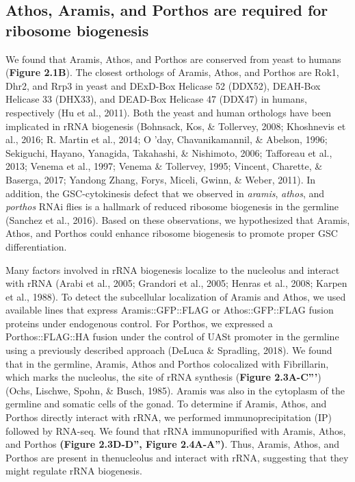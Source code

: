 \documentclass[12pt,oneside]{reedthesis}
\begin{document}
\hypertarget{athos-aramis-and-porthos-are-required-for-ribosome-biogenesis}{%
\subsection{Athos, Aramis, and Porthos are required for ribosome biogenesis}\label{athos-aramis-and-porthos-are-required-for-ribosome-biogenesis}}

We found that Aramis, Athos, and Porthos are conserved from yeast to
humans (\textbf{Figure 2.1B}). The closest orthologs of Aramis, Athos, and
Porthos are Rok1, Dhr2, and Rrp3 in yeast and DExD-Box Helicase 52
(DDX52), DEAH-Box Helicase 33 (DHX33), and DEAD-Box Helicase 47 (DDX47)
in humans, respectively (Hu et al., 2011). Both
the yeast and human orthologs have been implicated in rRNA biogenesis
(Bohnsack, Kos, \& Tollervey, 2008; Khoshnevis et al., 2016; R. Martin et al., 2014; O 'day, Chavanikamannil, \& Abelson, 1996; Sekiguchi, Hayano, Yanagida, Takahashi, \& Nishimoto, 2006; Tafforeau et al., 2013; Venema et al., 1997; Venema \& Tollervey, 1995; Vincent, Charette, \& Baserga, 2017; Yandong Zhang, Forys, Miceli, Gwinn, \& Weber, 2011). In addition, the
GSC-cytokinesis defect that we observed in \emph{aramis}, \emph{athos}, and
\emph{porthos} RNAi flies is a hallmark of reduced ribosome biogenesis in the
germline (Sanchez et al., 2016). Based on these observations, we
hypothesized that Aramis, Athos, and Porthos could enhance ribosome
biogenesis to promote proper GSC differentiation.

Many factors involved in rRNA biogenesis localize to the nucleolus and
interact with rRNA (Arabi et al., 2005; Grandori et al., 2005; Henras et al., 2008; Karpen et al., 1988). To detect
the subcellular localization of Aramis and Athos, we used available
lines that express Aramis::GFP::FLAG or Athos::GFP::FLAG fusion proteins
under endogenous control. For Porthos, we expressed a Porthos::FLAG::HA
fusion under the control of UASt promoter in the germline using a
previously described approach (DeLuca \& Spradling, 2018).
We found that in the germline, Aramis, Athos and Porthos colocalized
with Fibrillarin, which marks the nucleolus, the site of rRNA synthesis
(\textbf{Figure 2.3A-C'''}) (Ochs, Lischwe, Spohn, \& Busch, 1985). Aramis was
also in the cytoplasm of the germline and somatic cells of the gonad. To
determine if Aramis, Athos, and Porthos directly interact with rRNA, we
performed immunoprecipitation (IP) followed by RNA-seq. We found that
rRNA immunopurified with Aramis, Athos, and Porthos \textbf{(Figure 2.3D-D'', Figure 2.4A-A'')}.
Thus, Aramis, Athos, and Porthos are present in thenucleolus and interact with rRNA,
suggesting that they might regulate rRNA biogenesis.
\end{document}
